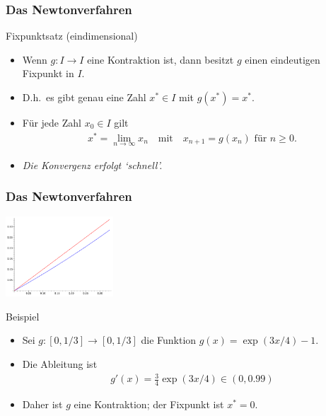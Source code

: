 \documentclass{beamer}
\newcommand{\ue}{\"u}
\newcommand{\mytitle}{Das Newtonverfahren}
\begin{document}
\begin{frame}\frametitle{\mytitle}
	\begin{block}{Fixpunktsatz (eindimensional)}
		\begin{itemize}
			\item Wenn $g:I\to I$ eine Kontraktion ist, dann besitzt $g$ einen eindeutigen Fixpunkt in $I$.
			\item D.h.\ es gibt genau eine Zahl $x^*\in I$ mit $g(x^*)=x^*$.
			\item F\ue r jede Zahl $x_0\in I$ gilt
				\begin{align*}
					x^*=\lim_{n\to\infty}x_n\quad\mbox{mit}\quad x_{n+1}=g(x_n)\mbox{ f\ue r }n\geq0.
				\end{align*}
			\item {\itshape Die Konvergenz erfolgt `schnell'.}
		\end{itemize}
	\end{block}
\end{frame}

\begin{frame}\frametitle{\mytitle}
	\hfill\includegraphics[height=30mm]{pics/plot_fix.pdf}
	\begin{block}{Beispiel}
		\begin{itemize}
			\item Sei $g:[0,1/3]\to[0,1/3]$ die Funktion $g(x)=\exp(3x/4)-1$.
			\item Die Ableitung ist
				\begin{align*}
					g'(x)=\frac{3}{4}\exp(3x/4)\in(0,0.99)
				\end{align*}
			\item Daher ist $g$ eine Kontraktion; der Fixpunkt ist $x^*=0$.
		\end{itemize}
	\end{block}
\end{frame}
\end{document}
